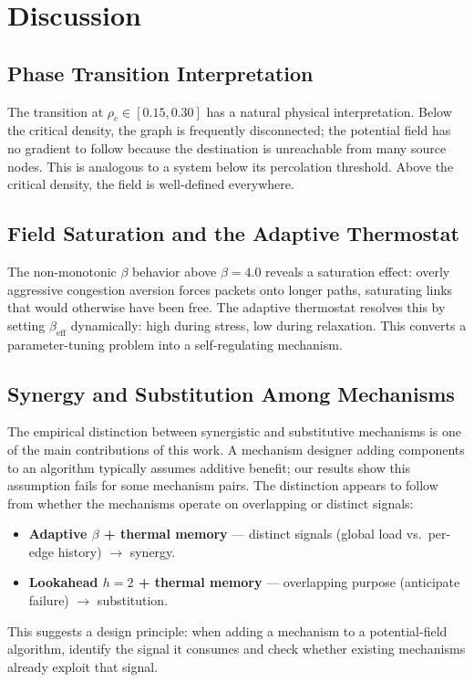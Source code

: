 \documentclass[11pt,a4paper]{article}
\begin{document}
\section{Discussion}

\subsection{Phase Transition Interpretation}

The transition at $\rho_c \in [0.15, 0.30]$ has a natural physical
interpretation. Below the critical density, the graph is frequently
disconnected; the potential field has no gradient to follow because
the destination is unreachable from many source nodes. This is
analogous to a system below its percolation threshold. Above the
critical density, the field is well-defined everywhere.

\subsection{Field Saturation and the Adaptive Thermostat}

The non-monotonic $\beta$ behavior above $\beta = 4.0$ reveals a
saturation effect: overly aggressive congestion aversion forces
packets onto longer paths, saturating links that would otherwise have
been free. The adaptive thermostat resolves this by setting
$\beta_{\mathrm{eff}}$ dynamically: high during stress, low during
relaxation. This converts a parameter-tuning problem into a
self-regulating mechanism.

\subsection{Synergy and Substitution Among Mechanisms}

The empirical distinction between synergistic and substitutive
mechanisms is one of the main contributions of this work. A mechanism
designer adding components to an algorithm typically assumes additive
benefit; our results show this assumption fails for some mechanism
pairs. The distinction appears to follow from whether the mechanisms
operate on overlapping or distinct signals:
\begin{itemize}[itemsep=1pt]
  \item \textbf{Adaptive $\beta$ + thermal memory} --- distinct
        signals (global load vs.\ per-edge history) $\rightarrow$
        synergy.
  \item \textbf{Lookahead $h{=}2$ + thermal memory} --- overlapping
        purpose (anticipate failure) $\rightarrow$ substitution.
\end{itemize}
This suggests a design principle: when adding a mechanism to a
potential-field algorithm, identify the signal it consumes and check
whether existing mechanisms already exploit that signal.
\end{document}
